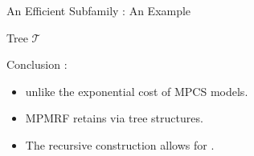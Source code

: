 \documentclass[11pt,xcolor={dvipsnames},hyperref={pdftex,pdfpagemode=UseNone,hidelinks,pdfdisplaydoctitle=true},usepdftitle=false]{beamer}
\begin{document}
\begin{frame}{An Efficient Subfamily : An Example}
\begin{minipage}{0.30\textwidth}
\hspace{-0.6cm} Tree $\mathcal{T}$
\vfill
\end{minipage}
\vfill
\pause
Conclusion : 
\begin{itemize}
    \item {} unlike the exponential cost of MPCS models.
    \item MPMRF retains  via tree structures.
    \item The recursive construction allows for .
\end{itemize}
\end{frame}
   
    
\end{document}
